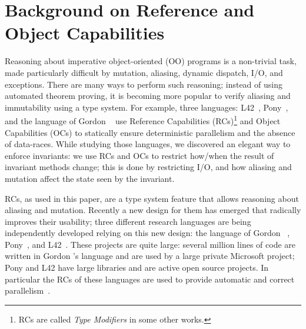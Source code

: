 \section{Background on Reference and Object Capabilities}
\label{s:TMsAndOCs}
Reasoning about imperative object-oriented (OO) programs is a non-trivial task,
made particularly difficult by mutation, aliasing, dynamic dispatch, I/O, and exceptions. There are many ways to perform such reasoning;
instead of using automated theorem proving, 
it is becoming more popular to verify aliasing and immutability using a type system.
For example, three languages: L42~\cite{ServettoZucca15,ServettoEtAl13a,JOT:issue_2011_01/article1,GianniniEtAl16}, Pony~\cite{clebsch2015deny,clebsch2017orca}, and the language of Gordon \etal~\cite{GordonEtAl12} use Reference Capabilities (RCs)\footnote{RCs are called \emph{Type Modifiers} in some other works.} and Object Capabilities (OCs) to statically ensure  deterministic parallelism and the absence of data-races.
While studying those languages, we discovered an elegant way to enforce invariants: we use RCs and OCs to restrict how/when the result of invariant methods change; this is done by restricting I/O, and how aliasing and mutation affect the state seen by the invariant.


RCs, as used in this paper, are a type system feature that allows reasoning about aliasing and mutation. Recently a new design for them has emerged that radically improves their usability;
three different research languages are being independently developed relying on this new design: the language of Gordon \etal~\cite{GordonEtAl12}, Pony~\cite{clebsch2015deny,clebsch2017orca}, and L42~\cite{ServettoZucca15,ServettoEtAl13a,JOT:issue_2011_01/article1,GianniniEtAl16}.
These projects are quite large: several million lines of code are written in Gordon \etal's language and are used by a large private Microsoft project; Pony and L42 have large libraries and are active open source projects. In particular the RCs of these languages are used to provide automatic and correct parallelism~\cite{GordonEtAl12,clebsch2015deny,clebsch2017orca,ServettoEtAl13a}.

